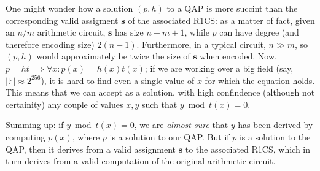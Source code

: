 \noindent One might wonder how a solution \((p, h)\) to a QAP is more succint than the
corresponding valid assigment \(\bm{s}\) of the associated R1CS: as a matter of fact, given an
\(n/m\) arithmetic circuit, \(\bm{s}\) has size \(n+m+1\), while \(p\) can have degree 
(and therefore encoding size) \(2(n-1)\).
Furthermore, in a typical circuit, \(n \gg m\), so \((p, h)\) would approximately be twice the size 
of \(\bm{s}\) when encoded.
Now, \(p = ht \implies \forall x\colon p(x) = h(x)t(x)\); if we are working over a big field 
(say, \(|\mathbb{F}| \approx 2^{256}\)), it is hard to find even a single value of \(x\) for which
the equation holds.
This means that we can accept as a solution, with high confindence (although not certainity)
any couple of values \(x, y\) such that \(y \bmod t(x) = 0\). 

Summing up: if \(y \bmod t(x) = 0\), we are \emph{almost sure} that \(y\) has been derived by 
computing \(p(x)\), where \(p\) is a solution to our QAP\@.
But if \(p\) is a solution to the QAP, then it derives from a valid assignment \(\bm{s}\) to the 
associated R1CS, which in turn derives from a valid computation of the original arithmetic circuit.

